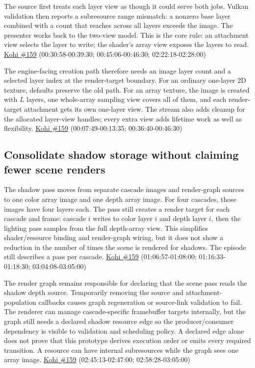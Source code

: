 The source first treats each layer view as though it could serve both jobs. Vulkan validation then reports a subresource range mismatch: a nonzero base layer combined with a count that reaches across all layers exceeds the image. The presenter works back to the two-view model. This is the core rule: an attachment view selects the layer to write; the shader's array view exposes the layers to read. \href{https://www.youtube.com/watch?v=FrtHF-9K1HI}{Kohi \#159} (00:30:58-00:39:30; 00:45:06-00:46:30; 02:22:18-02:28:00)

The engine-facing creation path therefore needs an image layer count and a selected layer index at the render-target boundary. For an ordinary one-layer 2D texture, defaults preserve the old path. For an array texture, the image is created with \(L\) layers, one whole-array sampling view covers all of them, and each render-target attachment gets its own one-layer view. The stream also adds cleanup for the allocated layer-view handles; every extra view adds lifetime work as well as flexibility. \href{https://www.youtube.com/watch?v=FrtHF-9K1HI}{Kohi \#159} (00:07:49-00:13:35; 00:36:40-00:46:30)

\subsection{Consolidate shadow storage without claiming fewer scene renders}\label{06-engine-ii-ch026-consolidate-shadow-storage-without-claiming-fewer-scene-renders}

\hypertarget{06-engine-ii-ch026-consolidate-shadow-storage-without-claiming-fewer-scene-renders}{}

The shadow pass moves from separate cascade images and render-graph sources to one color array image and one depth array image. For four cascades, those images have four layers each. The pass still creates a render target for each cascade and frame: cascade \(i\) writes to color layer \(i\) and depth layer \(i\), then the lighting pass samples from the full depth-array view. This simplifies shader/resource binding and render-graph wiring, but it does not show a reduction in the number of times the scene is rendered for shadows. The episode still describes a pass per cascade. \href{https://www.youtube.com/watch?v=FrtHF-9K1HI}{Kohi \#159} (01:06:57-01:08:00; 01:16:33-01:18:30; 03:04:08-03:05:00)

The render graph remains responsible for declaring that the scene pass reads the shadow depth source. Temporarily removing the source and attachment-population callbacks causes graph regeneration or source-link validation to fail. The renderer can manage cascade-specific framebuffer targets internally, but the graph still needs a declared shadow resource edge so the producer/consumer dependency is visible to validation and scheduling policy. A declared edge alone does not prove that this prototype derives execution order or emits every required transition. A resource can have internal subresources while the graph sees one array image. \href{https://www.youtube.com/watch?v=FrtHF-9K1HI}{Kohi \#159} (02:45:13-02:47:00; 02:58:28-03:05:00)

